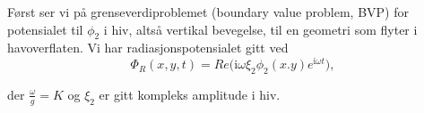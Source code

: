 Først ser vi på grenseverdiproblemet (boundary value problem, BVP) for potensialet til $\phi_2$ i hiv, altså vertikal bevegelse, til en geometri som flyter i havoverflaten. Vi har radiasjonspotensialet gitt ved
\begin{equation}
\Phi_R(x,y,t) = Re\Big( \mathrm{i} \omega \xi_2 \phi_2(x.y) e^{\mathrm{i} \omega t} \Big), 
\end{equation}

der $\frac{\omega}{g} = K$ og $\xi_2$ er gitt kompleks amplitude i hiv.

